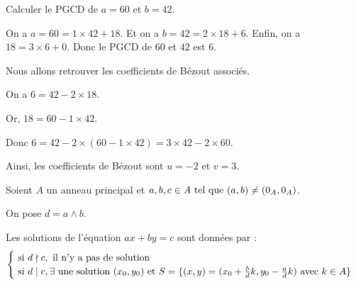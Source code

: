 \documentclass[12pt, a4paper]{report}
\begin{document}
\begin{example}
    Calculer le PGCD de $a = 60$ et $b=42$.

    On a $a=60=1\times42+18$.
    Et on a $b = 42 = 2\times 18 + 6$.
    Enfin, on a $18 = 3 \times 6 + 0$.
    Donc le PGCD de $60$ et $42$ est $6$.

    Nous allons retrouver les coefficients de Bézout associés.

    On a $6 = 42 - 2 \times 18$.

    Or, $18 = 60 - 1 \times 42$.

    Donc $6 = 42 - 2 \times (60 - 1 \times 42) = 3 \times 42 - 2 \times 60$.

    Ainsi, les coefficients de Bézout sont $u = -2$ et $v=3$.
\end{example}

\begin{property}[Équation $ax+by=c$]
    Soient $A$ un anneau principal et $a,b,c \in A \text{ tel que } (a,b)\neq (0_A,0_A)$.

    On pose $d = a \wedge b$.

    Les solutions de l'équation $ax + by = c$ sont données par :
    $$\begin{cases}
        \text{ si } d \nmid c, \text{ il n'y a pas de solution}\\
        \text{ si } d \mid c, \exists \text{ une solution }(x_0,y_0) \text{ et } S= \{(x,y) = (x_0 + \frac{b}{d}k, y_0 - \frac{a}{d}k) \text{ avec } k \in A\}
    \end{cases}$$
    
\end{property}
\end{document}
